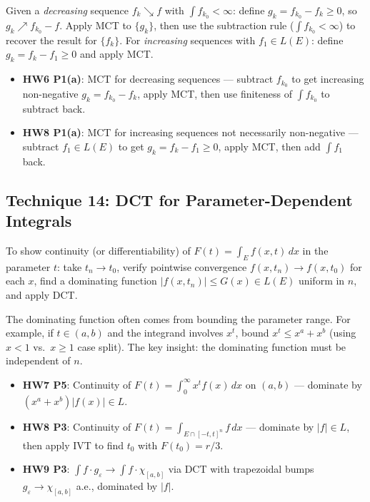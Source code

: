 \documentclass[11pt]{report}
\begin{document}
\begin{rembox}[Strategy]
Given a \textit{decreasing} sequence $f_k \searrow f$ with $\int f_{k_0} < \infty$: define $g_k = f_{k_0} - f_k \geq 0$, so $g_k \nearrow f_{k_0} - f$. Apply MCT to $\{g_k\}$, then use the subtraction rule ($\int f_{k_0} < \infty$) to recover the result for $\{f_k\}$. For \textit{increasing} sequences with $f_1 \in L(E)$: define $g_k = f_k - f_1 \geq 0$ and apply MCT.
\end{rembox}

\begin{exbox}
\begin{itemize}
\item \textbf{HW6 P1(a)}: MCT for decreasing sequences --- subtract $f_{k_0}$ to get increasing non-negative $g_k = f_{k_0} - f_k$, apply MCT, then use finiteness of $\int f_{k_0}$ to subtract back.
\item \textbf{HW8 P1(a)}: MCT for increasing sequences not necessarily non-negative --- subtract $f_1 \in L(E)$ to get $g_k = f_k - f_1 \geq 0$, apply MCT, then add $\int f_1$ back.
\end{itemize}
\end{exbox}

\subsection{Technique 14: DCT for Parameter-Dependent Integrals}

To show continuity (or differentiability) of $F(t) = \int_E f(x, t)\,dx$ in the parameter $t$: take $t_n \to t_0$, verify pointwise convergence $f(x, t_n) \to f(x, t_0)$ for each $x$, find a dominating function $|f(x, t_n)| \leq G(x) \in L(E)$ uniform in $n$, and apply DCT.

\begin{rembox}[Strategy]
The dominating function often comes from bounding the parameter range. For example, if $t \in (a, b)$ and the integrand involves $x^t$, bound $x^t \leq x^a + x^b$ (using $x < 1$ vs.\ $x \geq 1$ case split). The key insight: the dominating function must be independent of $n$.
\end{rembox}

\begin{exbox}
\begin{itemize}
\item \textbf{HW7 P5}: Continuity of $F(t) = \int_0^\infty x^t f(x)\,dx$ on $(a, b)$ --- dominate by $(x^a + x^b)|f(x)| \in L$.
\item \textbf{HW8 P3}: Continuity of $F(t) = \int_{E \cap [-t,t]^n} f\,dx$ --- dominate by $|f| \in L$, then apply IVT to find $t_0$ with $F(t_0) = r/3$.
\item \textbf{HW9 P3}: $\int f \cdot g_\varepsilon \to \int f \cdot \chi_{[a,b]}$ via DCT with trapezoidal bumps $g_\varepsilon \to \chi_{[a,b]}$ a.e., dominated by $|f|$.
\end{itemize}
\end{exbox}
\end{document}
